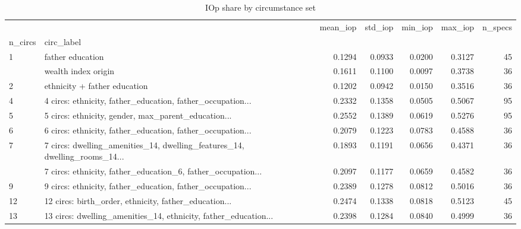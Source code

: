 \begin{table}
\caption{IOp share by circumstance set}
\label{tab:by_circ_set}
\begin{tabular}{llrrrrr}
\toprule
 &  & mean_iop & std_iop & min_iop & max_iop & n_specs \\
n_circs & circ_label &  &  &  &  &  \\
\midrule
\multirow[t]{2}{*}{1} & father education & 0.1294 & 0.0933 & 0.0200 & 0.3127 & 45 \\
 & wealth index origin & 0.1611 & 0.1100 & 0.0097 & 0.3738 & 36 \\
\cline{1-7}
2 & ethnicity + father education & 0.1202 & 0.0942 & 0.0150 & 0.3516 & 36 \\
\cline{1-7}
4 & 4 circs: ethnicity, father_education, father_occupation... & 0.2332 & 0.1358 & 0.0505 & 0.5067 & 95 \\
\cline{1-7}
5 & 5 circs: ethnicity, gender, max_parent_education... & 0.2552 & 0.1389 & 0.0619 & 0.5276 & 95 \\
\cline{1-7}
6 & 6 circs: ethnicity, father_education, father_occupation... & 0.2079 & 0.1223 & 0.0783 & 0.4588 & 36 \\
\cline{1-7}
\multirow[t]{2}{*}{7} & 7 circs: dwelling_amenities_14, dwelling_features_14, dwelling_rooms_14... & 0.1893 & 0.1191 & 0.0656 & 0.4371 & 36 \\
 & 7 circs: ethnicity, father_education_6, father_occupation... & 0.2097 & 0.1177 & 0.0659 & 0.4582 & 36 \\
\cline{1-7}
9 & 9 circs: ethnicity, father_education, father_occupation... & 0.2389 & 0.1278 & 0.0812 & 0.5016 & 36 \\
\cline{1-7}
12 & 12 circs: birth_order, ethnicity, father_education... & 0.2474 & 0.1338 & 0.0818 & 0.5123 & 45 \\
\cline{1-7}
13 & 13 circs: dwelling_amenities_14, ethnicity, father_education... & 0.2398 & 0.1284 & 0.0840 & 0.4999 & 36 \\
\cline{1-7}
\bottomrule
\end{tabular}
\end{table}
